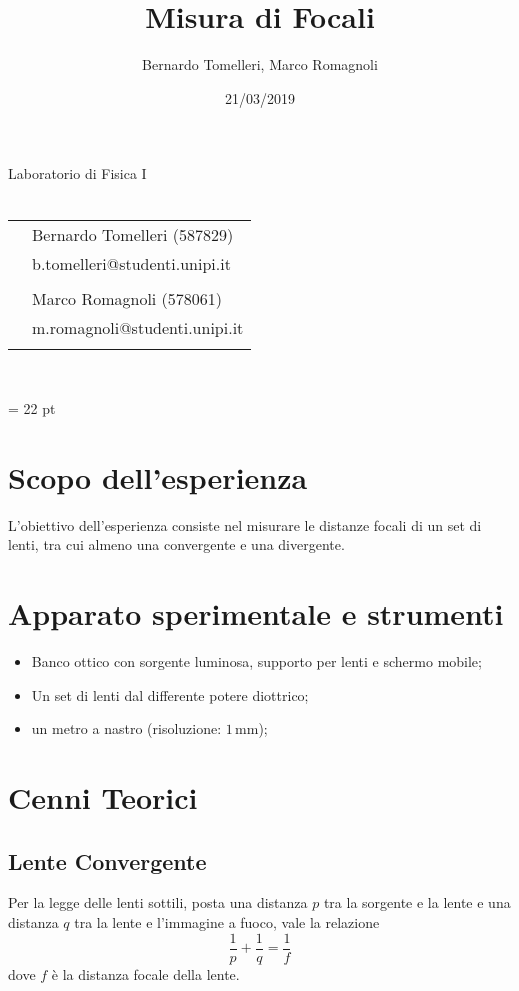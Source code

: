 \documentclass{article}[a4paper,11pt]
\title{Misura di Focali}
\author{Bernardo Tomelleri, Marco Romagnoli}
\date{21/03/2019}
\begin{document}
\begin{titlepage}
	\begin{center}
		{\huge{Laboratorio di Fisica I}}\\\vspace*{7mm} %
		{\huge{\textbf{\thetitle}}}\\\vspace*{15mm}
		\begin{tabular}{ll}
		& Bernardo Tomelleri (587829) \\
		& b.tomelleri@studenti.unipi.it\\ \\
		& Marco Romagnoli (578061) \\
		& m.romagnoli@studenti.unipi.it \\ \\
		\end{tabular}\\\vspace*{5mm}
		{\thedate}
	\end{center}
\end{titlepage}
\makeatother
\restoregeometry
\newpage

\tableofcontents

\vspace{2cm}

\emergencystretch = 22 pt
\section{Scopo dell'esperienza}
L'obiettivo dell'esperienza consiste nel misurare le distanze focali di un set di lenti, tra cui almeno una convergente e una divergente.
\section{Apparato sperimentale e strumenti}
\begin{itemize}
\item Banco ottico con sorgente luminosa, supporto per lenti e schermo mobile;
\item Un set di lenti dal differente potere diottrico;
\item un metro a nastro (risoluzione: $1 \, \si{\mm}$);
\end{itemize}

\section{Cenni Teorici}
\subsection*{Lente Convergente}
Per la legge delle lenti sottili, posta una distanza $p$ tra la sorgente e la lente e una distanza $q$ tra la lente e l'immagine a fuoco, vale la relazione
\begin{equation}\label{eq:focale}
\frac{1}{p} + \frac{1}{q} = \frac{1}{f}
\end{equation}
dove $f$ \`e la distanza focale della lente.\\
\end{document}
